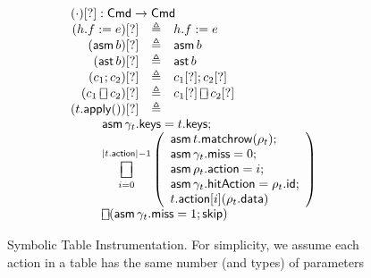 \documentclass{article}
\newcommand{\Cmd}{\mathsf{Cmd}}
\newcommand{\action}{\mathsf{action}}
\newcommand{\keys}{\mathsf{keys}}
\newcommand{\data}{\mathsf{data}}
\newcommand{\id}{\mathsf{id}}
\newcommand{\hitAction}{\mathsf{hitAction}}
\newcommand{\miss}{\mathsf{miss}}
\newcommand{\assert}{\mathop{\mathsf{ast}}}
\newcommand{\assume}{\mathop{\mathsf{asm}}}
\newcommand{\apply}{\mathsf{apply}}
\newcommand{\choiceop}{\rotatebox[origin=c]{90}{$\sqsubset\!\!\!\sqsupset$}}
\newcommand{\choice}{\mathbin{\choiceop}}
\DeclareMathOperator*{\bigchoice}{\scalerel*{\choiceop}{\sum}}
\newcommand{\SKIP}{\mathsf{skip}}
\newcommand{\instr}{[?]}
\newcommand{\matchrow}{\mathsf{matchrow}}
\theoremstyle{plain}
\theoremstyle{definition}
\theoremstyle{remark}
\begin{document}
\begin{figure}[htp]
\[\begin{array}{r >{\triangleq}cl}
  \multicolumn{3}{l}{(\cdot)\instr : \Cmd \to \Cmd} \\
  (h.f := e)\instr && h.f := e \\
  (\assume b)\instr && \assume b \\
  (\assert b)\instr && \assert b\\
  (c_1;c_2)\instr && c_1\instr;c_2\instr\\
  (c_1 \choice c_2)\instr && c_1\instr \choice c_2\instr\\
  (t.\apply())\instr &&\\
  \multicolumn{3}{l}{
    \qquad
    \begin{array}[t]{l} \displaystyle
      \assume \gamma_t.\keys = t.\keys; \\
    \displaystyle \bigchoice_{i=0}^{|t.\action| -1}
    \left(\begin{array}{l}
      \assume t.\matchrow(\rho_t); \\
      \assume \gamma_t.\miss = 0;\\
      \assume \rho_t.\action = i;\\
      \assume \gamma_t.\hitAction = \rho_t.\id;\\
      t.\action[i](\rho_t.\data)
    \end{array}\right)\\
    \choice (\assume \gamma_t.\miss = 1; \SKIP)  \\
  \end{array}}
  \end{array}
  \]
  \caption{Symbolic Table Instrumentation. For simplicity, we
    assume each action in a table has the same number (and types) of parameters}
  \label{fig:table-instrument}
\end{figure}
\end{document}
